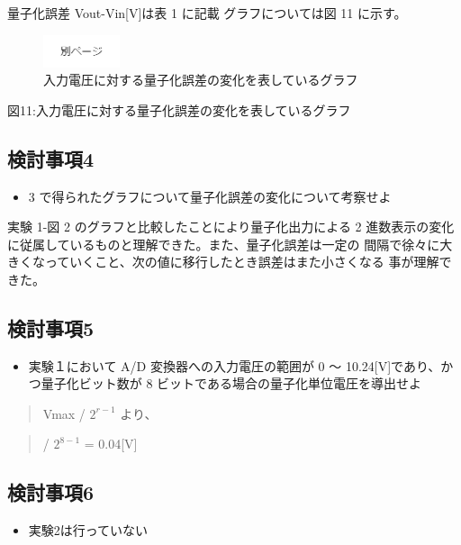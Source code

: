 \documentclass[10pt]{article}
\begin{document}
量子化誤差 Vout-Vin[V]は表 1 に記載 グラフについては図 11 に示す。

\begin{figure}[H]
		\centering
		\includegraphics[width=0.2\textwidth]{page.png}
		\caption{入力電圧に対する量子化誤差の変化を表しているグラフ}
\end{figure}
\pagebreak

図11:入力電圧に対する量子化誤差の変化を表しているグラフ
\pagebreak

\subsection{検討事項4}

\begin{itemize}
    \item  3 で得られたグラフについて量子化誤差の変化について考察せよ 
\end{itemize}

実験 1-図 2 のグラフと比較したことにより量子化出力による 2 進数表示の変化に従属しているものと理解できた。また、量子化誤差は一定の 間隔で徐々に大きくなっていくこと、次の値に移行したとき誤差はまた小さくなる 事が理解できた。 

\subsection{検討事項5}

\begin{itemize}
    \item 実験１において A/D 変換器への入力電圧の範囲が 0 ～ 10.24[V]であり、かつ量子化ビット数が 8 ビットである場合の量子化単位電圧を導出せよ 
\end{itemize}

 \begin{quote}
    \centering
    Vmax / $2^{r-1}$ より、\\
 \end{quote}

\begin{quote}
     / $2^{8-1}$ = 0.04[V] \\
 \end{quote}

 
\subsection{検討事項6}
\begin{itemize}
    \item 実験2は行っていない
\end{itemize}
\end{document}
